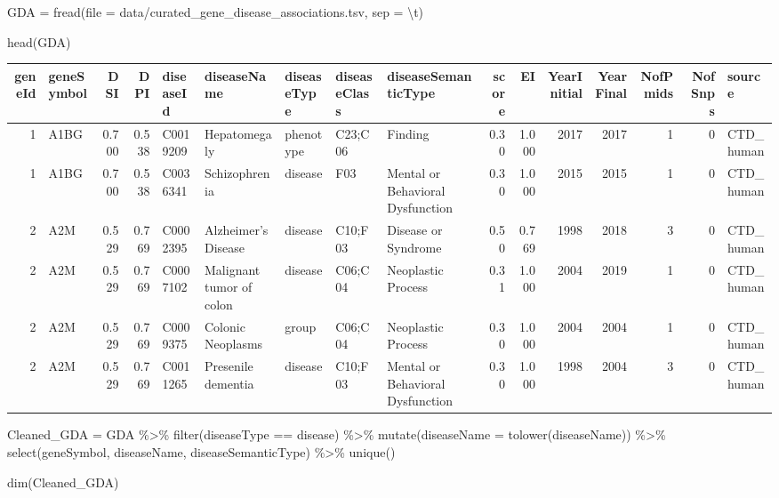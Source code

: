 \documentclass[
]{book}
\newenvironment{Shaded}{\begin{snugshade}}{\end{snugshade}}
\newcommand{\AttributeTok}[1]{\textcolor[rgb]{0.77,0.63,0.00}{#1}}
\newcommand{\FunctionTok}[1]{\textcolor[rgb]{0.00,0.00,0.00}{#1}}
\newcommand{\NormalTok}[1]{#1}
\newcommand{\OtherTok}[1]{\textcolor[rgb]{0.56,0.35,0.01}{#1}}
\newcommand{\SpecialCharTok}[1]{\textcolor[rgb]{0.00,0.00,0.00}{#1}}
\newcommand{\StringTok}[1]{\textcolor[rgb]{0.31,0.60,0.02}{#1}}
\begin{document}
\begin{Shaded}
\begin{Highlighting}[]
\NormalTok{GDA }\OtherTok{=} \FunctionTok{fread}\NormalTok{(}\AttributeTok{file =} \StringTok{\textquotesingle{}data/curated\_gene\_disease\_associations.tsv\textquotesingle{}}\NormalTok{, }\AttributeTok{sep =} \StringTok{\textquotesingle{}}\SpecialCharTok{\textbackslash{}t}\StringTok{\textquotesingle{}}\NormalTok{)}

\FunctionTok{head}\NormalTok{(GDA)}
\end{Highlighting}
\end{Shaded}

\begin{tabular}{r|l|r|r|l|l|l|l|l|r|r|r|r|r|r|l}
\hline
geneId & geneSymbol & DSI & DPI & diseaseId & diseaseName & diseaseType & diseaseClass & diseaseSemanticType & score & EI & YearInitial & YearFinal & NofPmids & NofSnps & source\\
\hline
1 & A1BG & 0.700 & 0.538 & C0019209 & Hepatomegaly & phenotype & C23;C06 & Finding & 0.30 & 1.000 & 2017 & 2017 & 1 & 0 & CTD\_human\\
\hline
1 & A1BG & 0.700 & 0.538 & C0036341 & Schizophrenia & disease & F03 & Mental or Behavioral Dysfunction & 0.30 & 1.000 & 2015 & 2015 & 1 & 0 & CTD\_human\\
\hline
2 & A2M & 0.529 & 0.769 & C0002395 & Alzheimer's Disease & disease & C10;F03 & Disease or Syndrome & 0.50 & 0.769 & 1998 & 2018 & 3 & 0 & CTD\_human\\
\hline
2 & A2M & 0.529 & 0.769 & C0007102 & Malignant tumor of colon & disease & C06;C04 & Neoplastic Process & 0.31 & 1.000 & 2004 & 2019 & 1 & 0 & CTD\_human\\
\hline
2 & A2M & 0.529 & 0.769 & C0009375 & Colonic Neoplasms & group & C06;C04 & Neoplastic Process & 0.30 & 1.000 & 2004 & 2004 & 1 & 0 & CTD\_human\\
\hline
2 & A2M & 0.529 & 0.769 & C0011265 & Presenile dementia & disease & C10;F03 & Mental or Behavioral Dysfunction & 0.30 & 1.000 & 1998 & 2004 & 3 & 0 & CTD\_human\\
\hline
\end{tabular}

\begin{Shaded}
\begin{Highlighting}[]
\NormalTok{Cleaned\_GDA }\OtherTok{=}\NormalTok{ GDA }\SpecialCharTok{\%\textgreater{}\%} \FunctionTok{filter}\NormalTok{(diseaseType }\SpecialCharTok{==} \StringTok{\textquotesingle{}disease\textquotesingle{}}\NormalTok{) }\SpecialCharTok{\%\textgreater{}\%}
  \FunctionTok{mutate}\NormalTok{(}\AttributeTok{diseaseName =} \FunctionTok{tolower}\NormalTok{(diseaseName)) }\SpecialCharTok{\%\textgreater{}\%}
  \FunctionTok{select}\NormalTok{(geneSymbol, diseaseName, diseaseSemanticType) }\SpecialCharTok{\%\textgreater{}\%}
  \FunctionTok{unique}\NormalTok{() }

\FunctionTok{dim}\NormalTok{(Cleaned\_GDA)}
\end{Highlighting}
\end{Shaded}
\end{document}
